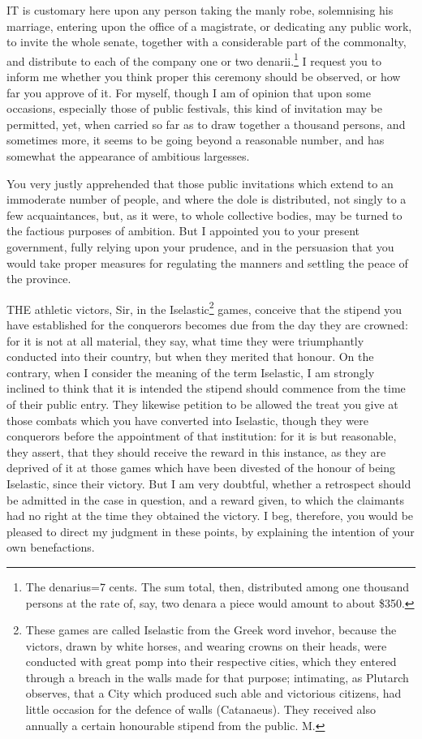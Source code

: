 IT is customary here upon any person taking the manly robe, solemnising
his marriage, entering upon the office of a magistrate, or dedicating any
public work, to invite the whole senate, together with a considerable part
of the commonalty, and distribute to each of the company one or two
denarii.\footnote{The denarius=7 cents.
The sum total, then, distributed among one thousand persons at the rate
of, say, two denara a piece would amount to about \$350.} I request you to inform me whether you
think proper this ceremony should be observed, or how far you approve of
it. For myself, though I am of opinion that upon some occasions,
especially those of public festivals, this kind of invitation may be
permitted, yet, when carried so far as to draw together a thousand
persons, and sometimes more, it seems to be going beyond a reasonable
number, and has somewhat the appearance of ambitious largesses.


You very justly apprehended that those public invitations which extend to
an immoderate number of people, and where the dole is distributed, not
singly to a few acquaintances, but, as it were, to whole collective
bodies, may be turned to the factious purposes of ambition. But I
appointed you to your present government, fully relying upon your
prudence, and in the persuasion that you would take proper measures for
regulating the manners and settling the peace of the province.


THE athletic victors, Sir, in the Iselastic\footnote{These games are
called Iselastic from the Greek word invehor, because the victors, drawn
by white horses, and wearing crowns on their heads, were conducted with
great pomp into their respective cities, which they entered through a
breach in the walls made for that purpose; intimating, as Plutarch
observes, that a City which produced such able and victorious citizens,
had little occasion for the defence of walls (Catanaeus). They received
also annually a certain honourable stipend from the public. M.} games, conceive
that the stipend you have established for the conquerors becomes due from
the day they are crowned: for it is not at all material, they say, what
time they were triumphantly conducted into their country, but when they
merited that honour. On the contrary, when I consider the meaning of the
term Iselastic, I am strongly inclined to think that it is intended the
stipend should commence from the time of their public entry. They likewise
petition to be allowed the treat you give at those combats which you have
converted into Iselastic, though they were conquerors before the
appointment of that institution: for it is but reasonable, they assert,
that they should receive the reward in this instance, as they are deprived
of it at those games which have been divested of the honour of being
Iselastic, since their victory. But I am very doubtful, whether a
retrospect should be admitted in the case in question, and a reward given,
to which the claimants had no right at the time they obtained the victory.
I beg, therefore, you would be pleased to direct my judgment in these
points, by explaining the intention of your own benefactions.

